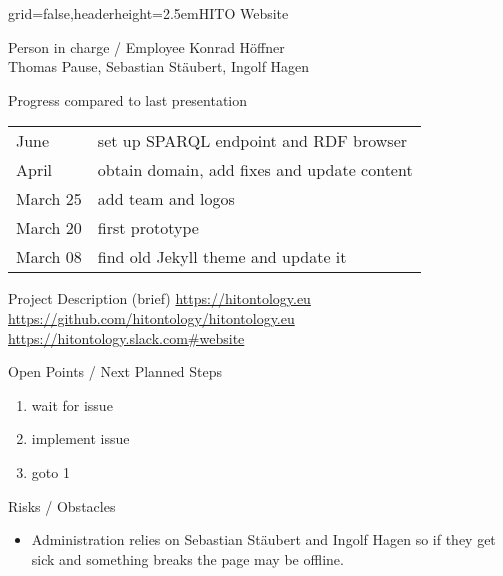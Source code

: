 \documentclass[]{kiesgrube}
\begin{document}
\begin{poster}%
{grid=false,headerheight=2.5em}{}{HITO Website}{}

\begin{posterbox}[name=person,column=0,row=0]{Person in charge / Employee}
Konrad Höffner\\
Thomas Pause, Sebastian Stäubert, Ingolf Hagen
\end{posterbox}
\begin{posterbox}[name=progress,below=person]{Progress compared to last presentation}
\begin{tabular}{ll}
June		&set up SPARQL endpoint and RDF browser\\
April 		&obtain domain, add fixes and update content\\
March 25	&add team and logos\\
March 20	&first prototype\\
March 08	&find old Jekyll theme and update it\\
\end{tabular}
\end{posterbox}
\begin{posterbox}[name=description,below=progress]{Project Description (brief)}
\url{https://hitontology.eu}\\
\url{https://github.com/hitontology/hitontology.eu}\\
\url{https://hitontology.slack.com#website}
\end{posterbox}
\begin{posterbox}[name=open,column=1,row=0]{Open Points / Next Planned Steps}
\begin{enumerate}
\item wait for issue
\item implement issue
\item goto 1
\end{enumerate}
\end{posterbox}
\begin{posterbox}[name=risks,column=1,below=open]{Risks / Obstacles}
\begin{itemize}
\item Administration relies on Sebastian Stäubert and Ingolf Hagen so if they get sick and something breaks the page may be offline. 

\end{itemize}
\end{posterbox}
\end{poster}
\end{document}
